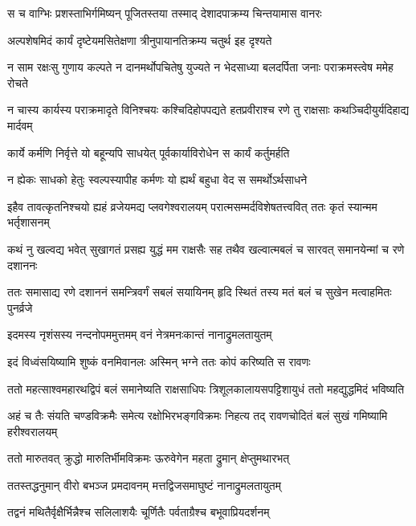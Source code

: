 
\twolineshloka
{स च वाग्भिः प्रशस्ताभिर्गमिष्यन् पूजितस्तया}
{तस्माद् देशादपाक्रम्य चिन्तयामास वानरः} %

\twolineshloka
{अल्पशेषमिदं कार्यं दृष्टेयमसितेक्षणा}
{त्रीनुपायानतिक्रम्य चतुर्थ इह दृश्यते} %

\twolineshloka
{न साम रक्षःसु गुणाय कल्पते न दानमर्थोपचितेषु युज्यते}
{न भेदसाध्या बलदर्पिता जनाः पराक्रमस्त्वेष ममेह रोचते} %

\twolineshloka
{न चास्य कार्यस्य पराक्रमादृते विनिश्चयः कश्चिदिहोपपद्यते}
{हतप्रवीराश्च रणे तु राक्षसाः कथञ्चिदीयुर्यदिहाद्य मार्दवम्} %

\twolineshloka
{कार्ये कर्मणि निर्वृत्ते यो बहून्यपि साधयेत्}
{पूर्वकार्याविरोधेन स कार्यं कर्तुमर्हति} %

\twolineshloka
{न ह्येकः साधको हेतुः स्वल्पस्यापीह कर्मणः}
{यो ह्यर्थं बहुधा वेद स समर्थोऽर्थसाधने} %

\twolineshloka
{इहैव तावत्कृतनिश्चयो ह्यहं व्रजेयमद्य प्लवगेश्वरालयम्}
{परात्मसम्मर्दविशेषतत्त्ववित् ततः कृतं स्यान्मम भर्तृशासनम्} %

\twolineshloka
{कथं नु खल्वद्य भवेत् सुखागतं प्रसह्य युद्धं मम राक्षसैः सह}
{तथैव खल्वात्मबलं च सारवत् समानयेन्मां च रणे दशाननः} %

\twolineshloka
{ततः समासाद्य रणे दशाननं समन्त्रिवर्गं सबलं सयायिनम्}
{हृदि स्थितं तस्य मतं बलं च सुखेन मत्वाहमितः पुनर्व्रजे} %

\twolineshloka
{इदमस्य नृशंसस्य नन्दनोपममुत्तमम्}
{वनं नेत्रमनःकान्तं नानाद्रुमलतायुतम्} %

\twolineshloka
{इदं विध्वंसयिष्यामि शुष्कं वनमिवानलः}
{अस्मिन् भग्ने ततः कोपं करिष्यति स रावणः} %

\twolineshloka
{ततो महत्साश्वमहारथद्विपं बलं समानेष्यति राक्षसाधिपः}
{त्रिशूलकालायसपट्टिशायुधं ततो महद्युद्धमिदं भविष्यति} %

\twolineshloka
{अहं च तैः संयति चण्डविक्रमैः समेत्य रक्षोभिरभङ्गविक्रमः}
{निहत्य तद् रावणचोदितं बलं सुखं गमिष्यामि हरीश्वरालयम्} %

\twolineshloka
{ततो मारुतवत् क्रुद्धो मारुतिर्भीमविक्रमः}
{ऊरुवेगेन महता द्रुमान् क्षेप्तुमथारभत्} %

\twolineshloka
{ततस्तद्धनुमान् वीरो बभञ्ज प्रमदावनम्}
{मत्तद्विजसमाघुष्टं नानाद्रुमलतायुतम्} %

\twolineshloka
{तद्वनं मथितैर्वृक्षैर्भिन्नैश्च सलिलाशयैः}
{चूर्णितैः पर्वताग्रैश्च बभूवाप्रियदर्शनम्} %

